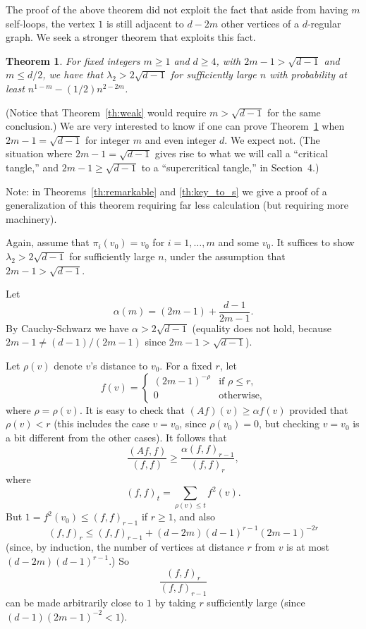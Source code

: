 \documentclass[12pt]{article}
\newtheorem{theorem}{Theorem}[section]
\newcommand{\proof}{{\par\noindent {\bf Proof}\space\space}}
\begin{document}
The proof of the above theorem did not exploit the fact that aside from
having $m$ self-loops, the vertex $1$ is still adjacent to $d-2m$ other
vertices of a $d$-regular graph.
We seek a stronger theorem that exploits this fact.

\begin{theorem}\label{th:improved_bound}
For fixed integers $m\ge 1$ and $d\ge 4$, with $2m-1> \sqrt{d-1}$ and
$m\le d/2$,
we have that $\lambda_2>2\sqrt{d-1}$ 
for sufficiently large $n$ with probability at least
$n^{1-m}-(1/2)n^{2-2m}$.
\end{theorem}
(Notice that Theorem~\ref{th:weak} would require $m>\sqrt{d-1}$ for
the same conclusion.)
We are very interested to know if one can prove Theorem~\ref{th:improved_bound}
when
$2m-1=\sqrt{d-1}$ for integer $m$ and even integer $d$.  We expect not.
(The situation where $2m-1=\sqrt{d-1}$
gives rise to what we will call a ``critical tangle,'' and 
$2m-1\ge\sqrt{d-1}$ to a ``supercritical tangle,'' in Section~4.)
\proof
Note: in Theorems~\ref{th:remarkable} and \ref{th:key_to_s} we give
a proof of a generalization of this theorem requiring far less
calculation (but requiring more machinery).

Again, assume that $\pi_i(v_0)=v_0$ for $i=1,\ldots,m$ and some $v_0$.  
It suffices to show
$\lambda_2>2\sqrt{d-1}$ for sufficiently large $n$, under the assumption
that $2m-1>\sqrt{d-1}$.

Let
\begin{equation}\label{eq:alpha}
\alpha(m) = (2m-1)+\frac{d-1}{2m-1}.
\end{equation}
By Cauchy-Schwarz we have $\alpha>2\sqrt{d-1}$ (equality does not hold,
because $2m-1\ne (d-1)/(2m-1)$ since $2m-1>\sqrt{d-1}$).  

Let $\rho(v)$ denote $v$'s distance to $v_0$.
For a fixed $r$, let
$$
f(v) = \left\{ \begin{array}{ll} 
(2m-1)^{-\rho} & \mbox{if $\rho\le r$,} \\
0 & \mbox{otherwise,} \end{array}\right.
$$
where $\rho=\rho(v)$.  It is easy to check that $(Af)(v)\ge\alpha f(v)$
provided that $\rho(v)<r$ (this includes the case $v=v_0$, since $\rho(v_0)=0$,
but checking $v=v_0$ is a bit different from the other cases).
It follows that
\begin{equation}\label{eq:ray1}
\frac{(Af,f)}{(f,f)} \ge \frac{\alpha(f,f)_{r-1}}{(f,f)_r},
\end{equation}
where
$$
(f,f)_t = \sum_{\rho(v)\le t} f^2(v).
$$
But $1=f^2(v_0)\le (f,f)_{r-1}$ if $r\ge 1$, and also
$$
(f,f)_r\le (f,f)_{r-1}+(d-2m)(d-1)^{r-1}(2m-1)^{-2r}
$$ 
(since, by induction, the number of vertices at distance $r$ from
$v$ is at most $(d-2m)(d-1)^{r-1}$.)
So
\begin{equation}\label{eq:ray2}
\frac{(f,f)_r}{(f,f)_{r-1}}
\end{equation}
can be made arbitrarily close to $1$ by taking $r$ sufficiently large
(since $(d-1)(2m-1)^{-2}<1$).  
\end{document}
